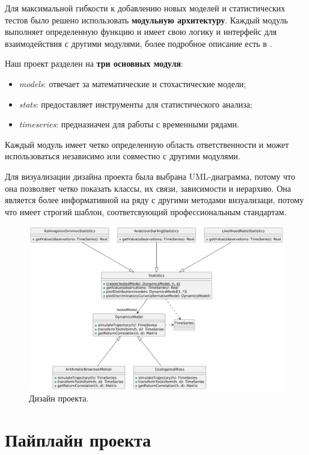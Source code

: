 \documentclass{article}
\begin{document}
Для максимальной гибкости к добавлению новых моделей и статистических 
тестов было решено использовать \textbf{модульную архитектуру}. Каждый модуль 
выполняет определенную функцию и имеет свою логику и интерфейс для 
взаимодействия с другими модулями, более подробное описание есть 
в \cite{RMarch}.

Наш проект разделен на \textbf{три основных модуля}:
\begin{itemize}
    \item \textit{models}: отвечает за математические и стохастические модели;
    \item \textit{stats}: предоставляет инструменты для статистического анализа;
    \item \textit{timeseries}: предназначен для работы с временными рядами.
\end{itemize}

Каждый модуль имеет четко определенную область ответственности и может 
использоваться независимо или совместно с другими модулями. 

Для визуализации дизайна проекта была выбрана UML-диаграмма, потому что 
она позволяет четко показать классы, их связи, зависимости и иерархию. Она 
является более информативной на ряду с другими методами визуализаци, потому 
что имеет строгий шаблон, соответсвующий профессиональным стандартам. 

\begin{figure}[h]
    \centering
     \includegraphics[width=0.9\linewidth]{uml.png}
    \caption{Дизайн проекта.}
    \label{fig:fft-heston-cpp}
\end{figure}

\section{Пайплайн проекта}
\end{document}

